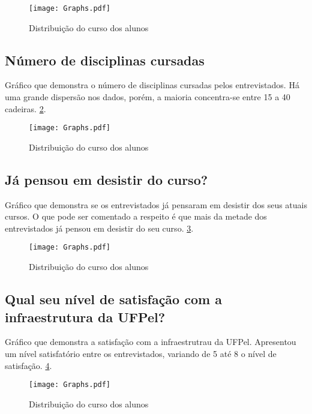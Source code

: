 \documentclass[11pt]{scrartcl} %
\begin{document}
\begin{figure}[h]
  \centering
  \texttt{[image: Graphs.pdf]}
  \label{fig:graph5}
  \caption{Distribuição do curso dos alunos}
\end{figure}

\subsection{Número de disciplinas cursadas}

Gráfico que demonstra o número de disciplinas cursadas pelos entrevistados. Há uma grande dispersão nos dados, porém, a maioria concentra-se entre 15 a 40 cadeiras. \ref{fig:graph6}.

\begin{figure}[h]
  \centering
  \texttt{[image: Graphs.pdf]}
  \label{fig:graph6}
  \caption{Distribuição do curso dos alunos}
\end{figure}

\subsection{Já pensou em desistir do curso?}

Gráfico que demonstra se os entrevistados já pensaram em desistir dos seus atuais cursos. O que pode ser comentado a respeito é que mais da metade dos entrevistados já pensou em desistir do seu curso. \ref{fig:graph7}.

\begin{figure}[h]
  \centering
  \texttt{[image: Graphs.pdf]}
  \label{fig:graph7}
  \caption{Distribuição do curso dos alunos}
\end{figure}

\subsection{Qual seu nível de satisfação com a infraestrutura da UFPel?}

Gráfico que demonstra a satisfação com a infraestrutrau da UFPel. Apresentou um nível satisfatório entre os entrevistados, variando de 5 até 8 o nível de satisfação. \ref{fig:graph8}.

\begin{figure}[h]
  \centering
  \texttt{[image: Graphs.pdf]}
  \label{fig:graph8}
  \caption{Distribuição do curso dos alunos}
\end{figure}
\end{document}
